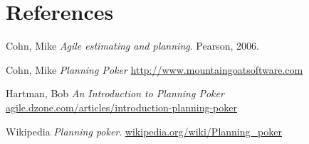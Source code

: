 \documentclass[dvips,11pt,xcolor=dvipsnames]{beamer}
\numberwithin{table}{section}
\numberwithin{figure}{section} %
\begin{document}
% 
% 
\begin{frame}{}
  
  
\end{frame}

% 
% 

\section{References}

\begin{frame}
  
  \begin{thebibliography}{2}  
    
    \beamertemplatebookbibitems %
  Cohn, Mike 
    \newblock \emph{Agile estimating and planning}. Pearson, 2006.
    
    \beamertemplatearticlebibitems   
    
  Cohn, Mike 
    \newblock  \emph{Planning Poker}
    \newblock  \url{http://www.mountaingoatsoftware.com}
    
  Hartman, Bob
    \newblock  \emph{An Introduction to Planning Poker}
    \newblock  \url{agile.dzone.com/articles/introduction-planning-poker}

   Wikipedia
    \newblock \emph{Planning poker}.
    \newblock  \url{wikipedia.org/wiki/Planning_poker}
    
    
    \beamertemplatearticlebibitems   
    
    

  \end{thebibliography}  
\end{frame}
\end{document}
